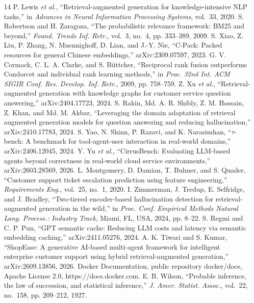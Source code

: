 \documentclass[cameraready]{ieeeconf}
\begin{document}
\begin{thebibliography}{14}
 P. Lewis \emph{et al.}, ``Retrieval-augmented generation for knowledge-intensive {NLP} tasks,'' in \emph{Advances in Neural Information Processing Systems}, vol.~33, 2020.
 S. Robertson and H. Zaragoza, ``The probabilistic relevance framework: {BM25} and beyond,'' \emph{Found. Trends Inf. Retr.}, vol.~3, no.~4, pp. 333--389, 2009.
 S. Xiao, Z. Liu, P. Zhang, N. Muennighoff, D. Lian, and J.-Y. Nie, ``{C-Pack}: Packed resources for general {Chinese} embeddings,'' arXiv:2309.07597, 2023.
 G. V. Cormack, C. L. A. Clarke, and S. B{\"u}ttcher, ``Reciprocal rank fusion outperforms {Condorcet} and individual rank learning methods,'' in \emph{Proc. 32nd Int. ACM SIGIR Conf. Res. Develop. Inf. Retr.}, 2009, pp. 758--759.
 Z. Xu \emph{et al.}, ``Retrieval-augmented generation with knowledge graphs for customer service question answering,'' arXiv:2404.17723, 2024.
 S. Rakin, Md. A. R. Shibly, Z. M. Hossain, Z. Khan, and Md. M. Akbar, ``Leveraging the domain adaptation of retrieval augmented generation models for question answering and reducing hallucination,'' arXiv:2410.17783, 2024.
 S. Yao, N. Shinn, P. Razavi, and K. Narasimhan, ``$\tau$-bench: A benchmark for tool-agent-user interaction in real-world domains,'' arXiv:2406.12045, 2024.
 Y. Yu \emph{et al.}, ``{CirrusBench}: Evaluating {LLM}-based agents beyond correctness in real-world cloud service environments,'' arXiv:2603.28569, 2026.
 L. Montgomery, D. Damian, T. Bulmer, and S. Quader, ``Customer support ticket escalation prediction using feature engineering,'' \emph{Requirements Eng.}, vol.~25, no.~1, 2020.
 I. Zimmerman, J. Tredup, E. Selfridge, and J. Bradley, ``Two-tiered encoder-based hallucination detection for retrieval-augmented generation in the wild,'' in \emph{Proc. Conf. Empirical Methods Natural Lang. Process.: Industry Track}, Miami, FL, USA, 2024, pp. 8--22.
 S. Regmi and C. P. Pun, ``{GPT} semantic cache: Reducing {LLM} costs and latency via semantic embedding caching,'' arXiv:2411.05276, 2024.
 A. K. Tiwari and S. Kumar, ``{ShopEase}: A generative {AI}-based multi-agent framework for intelligent enterprise customer support using hybrid retrieval-augmented generation,'' arXiv:2609.13856, 2026.
 Docker Documentation, public repository docker/docs, Apache License 2.0, https://docs.docker.com.
 E. B. Wilson, ``Probable inference, the law of succession, and statistical inference,'' \emph{J. Amer. Statist. Assoc.}, vol.~22, no.~158, pp. 209--212, 1927.
\end{thebibliography}
\end{document}
